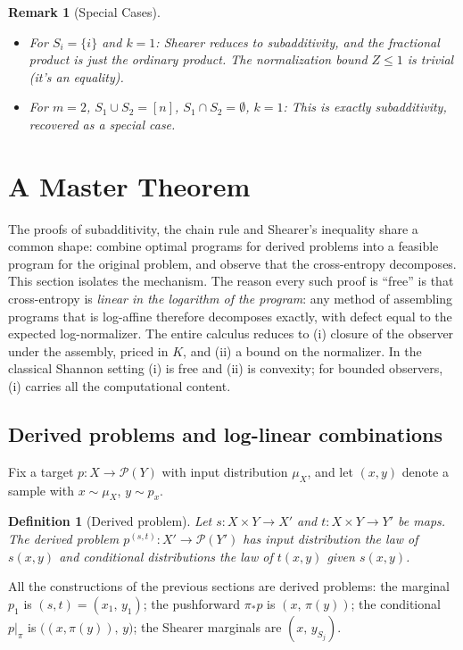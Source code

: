 \documentclass[11pt]{article}
\newtheorem{definition}{Definition}
\newtheorem{remark}{Remark}
\begin{document}
\begin{remark}[Special Cases]
\begin{itemize}
    \item For $S_i = \{i\}$ and $k = 1$: Shearer reduces to subadditivity, and the fractional product is just the ordinary product. The normalization bound $Z \leq 1$ is trivial (it's an equality).
    \item For $m = 2$, $S_1 \cup S_2 = [n]$, $S_1 \cap S_2 = \emptyset$, $k = 1$: This is exactly subadditivity, recovered as a special case.
\end{itemize}
\end{remark}


\section{A Master Theorem}

The proofs of subadditivity, the chain rule and Shearer's inequality share a common shape: combine optimal programs for derived problems into a feasible program for the original problem, and observe that the cross-entropy decomposes. This section isolates the mechanism. The reason every such proof is ``free'' is that cross-entropy is \emph{linear in the logarithm of the program}: any method of assembling programs that is log-affine therefore decomposes exactly, with defect equal to the expected log-normalizer. The entire calculus reduces to (i) closure of the observer under the assembly, priced in $K$, and (ii) a bound on the normalizer. In the classical Shannon setting (i) is free and (ii) is convexity; for bounded observers, (i) carries all the computational content.

\subsection*{Derived problems and log-linear combinations}

Fix a target $p: X \to \mathcal P(Y)$ with input distribution $\mu_X$, and let $(x,y)$ denote a sample with $x \sim \mu_X$, $y \sim p_x$.

\begin{definition}[Derived problem]
Let $s: X \times Y \to X'$ and $t: X \times Y \to Y'$ be maps. The \emph{derived problem} $p^{(s,t)}: X' \to \mathcal P(Y')$ has input distribution the law of $s(x,y)$ and conditional distributions the law of $t(x,y)$ given $s(x,y)$.
\end{definition}

All the constructions of the previous sections are derived problems: the marginal $p_1$ is $(s,t) = (x_1,\, y_1)$; the pushforward $\pi_* p$ is $(x,\, \pi(y))$; the conditional $p|_\pi$ is $\big((x,\pi(y)),\, y\big)$; the Shearer marginals are $(x,\, y_{S_j})$.
\end{document}
